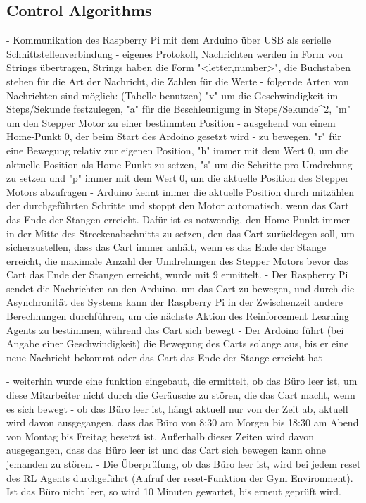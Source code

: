 \subsection{Control Algorithms}
- Kommunikation des Raspberry Pi mit dem Arduino über USB als serielle Schnittstellenverbindung
- eigenes Protokoll, Nachrichten werden in Form von Strings übertragen, Strings haben die Form "<letter,number>", die Buchstaben stehen für die Art der Nachricht, die Zahlen für die Werte
- folgende Arten von Nachrichten sind möglich: (Tabelle benutzen) "v" um die Geschwindigkeit im Steps/Sekunde festzulegen, "a" für die Beschleunigung in Steps/Sekunde^2, "m" um den Stepper Motor zu einer bestimmten Position - ausgehend von einem Home-Punkt 0, der beim Start des Ardoino gesetzt wird - zu bewegen, "r" für eine Bewegung relativ zur eigenen Position, "h" immer mit dem Wert 0, um die aktuelle Position als Home-Punkt zu setzen, "s" um die Schritte pro Umdrehung zu setzen und "p" immer mit dem Wert 0, um die aktuelle Position des Stepper Motors abzufragen
- Arduino kennt immer die aktuelle Position durch mitzählen der durchgeführten Schritte und stoppt den Motor automatisch, wenn das Cart das Ende der Stangen erreicht. Dafür ist es notwendig, den Home-Punkt immer in der Mitte des Streckenabschnitts zu setzen, den das Cart zurücklegen soll, um sicherzustellen, dass das Cart immer anhält, wenn es das Ende der Stange erreicht, die maximale Anzahl der Umdrehungen des Stepper Motors bevor das Cart das Ende der Stangen erreicht, wurde mit 9 ermittelt.
- Der Raspberry Pi sendet die Nachrichten an den Arduino, um das Cart zu bewegen, und durch die Asynchronität des Systems kann der Raspberry Pi in der Zwischenzeit andere Berechnungen durchführen, um die nächste Aktion des Reinforcement Learning Agents zu bestimmen, während das Cart sich bewegt
- Der Ardoino führt (bei Angabe einer Geschwindigkeit) die Bewegung des Carts solange aus, bis er eine neue Nachricht bekommt oder das Cart das Ende der Stange erreicht hat

- weiterhin wurde eine funktion eingebaut, die ermittelt, ob das Büro leer ist, um diese Mitarbeiter nicht durch die Geräusche zu stören, die das Cart macht, wenn es sich bewegt
- ob das Büro leer ist, hängt aktuell nur von der Zeit ab, aktuell wird davon ausgegangen, dass das Büro von 8:30 am Morgen bis 18:30 am Abend von Montag bis Freitag besetzt ist. Außerhalb dieser Zeiten wird davon ausgegangen, dass das Büro leer ist und das Cart sich bewegen kann ohne jemanden zu stören.
- Die Überprüfung, ob das Büro leer ist, wird bei jedem reset des RL Agents durchgeführt (Aufruf der reset-Funktion der Gym Environment). Ist das Büro nicht leer, so wird 10 Minuten gewartet, bis erneut geprüft wird.
